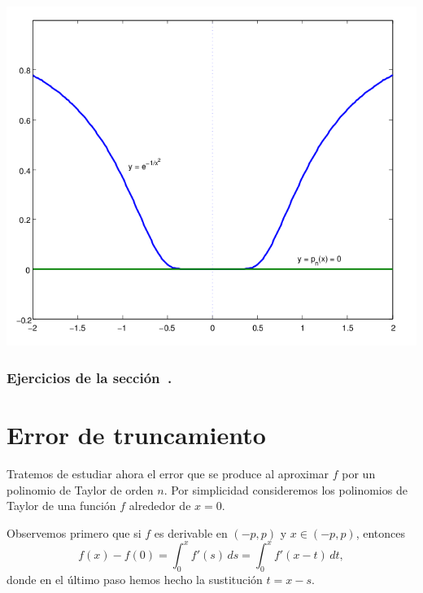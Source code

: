 \centerline{\includegraphics[width=.6\textwidth]{pics/taylor-patologico.png}}



\subsubsection*{Ejercicios de la sección~.}

\begin{enumerate}

\end{enumerate}


\section{Error de truncamiento}

Tratemos de estudiar ahora el error que se produce al aproximar $f$ por un polinomio de Taylor de orden $n$. Por simplicidad consideremos los polinomios de Taylor de una función $f$ alrededor de $x=0$.

Observemos primero que si $f$ es derivable en $(-p,p)$ y $x \in (-p,p)$, entonces
\[
 f(x) - f(0) = \int_0^x f'(s)\, ds = \int_0^x f'(x-t) \, dt,
\]
donde en el último paso hemos hecho la sustitución $t=x-s$.

